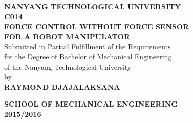 \begin{titlepage}
\begin{center}

\uppercase{\textbf{\large NANYANG TECHNOLOGICAL UNIVERSITY}}
\\[6cm]

\uppercase{\textbf{C014 \\Force Control Without Force Sensor \\ for a Robot Manipulator }}
\\[6cm]

Submitted in Partial Fulfillment of the Requirements\\
for the Degree of Bachelor of Mechanical Engineering\\
of the Nanyang Technological University
\\[0.8cm]

by
\\[0.8cm]

\uppercase{
\textbf{
Raymond Djajalaksana
}}

\vfill

\textsc{\bfseries SCHOOL OF MECHANICAL ENGINEERING}
\\
\textbf{2015/2016}

\end{center}
\end{titlepage}
